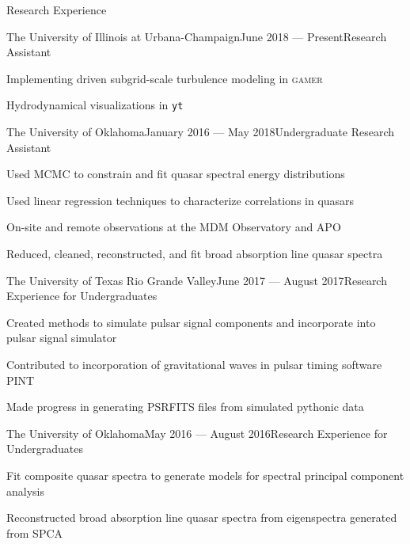 \documentclass{resume} %
\begin{document}
\begin{rSection}{Research Experience}

\begin{rSubsection}{The University of Illinois at Urbana-Champaign}{June 2018 --- Present}{Research Assistant}{}
\item Implementing driven subgrid-scale turbulence modeling in \textsc{gamer}
\item Hydrodynamical visualizations in \texttt{yt}
\end{rSubsection}


\begin{rSubsection}{The University of Oklahoma}{January 2016 --- May 2018}{Undergraduate Research Assistant}{}
\item Used MCMC to constrain and fit quasar spectral energy distributions
\item Used linear regression techniques to characterize correlations in quasars
\item On-site and remote observations at the MDM Observatory and APO
\item Reduced, cleaned, reconstructed, and fit broad absorption line quasar spectra
\end{rSubsection}


\begin{rSubsection}{The University of Texas Rio Grande Valley}{June 2017 --- August 2017}{Research Experience for Undergraduates}{}
\item Created methods to simulate pulsar signal components and incorporate into pulsar signal simulator
\item Contributed to incorporation of gravitational waves in pulsar timing software PINT
\item Made progress in generating PSRFITS files from simulated pythonic data
\end{rSubsection}


\begin{rSubsection}{The University of Oklahoma}{May 2016 --- August 2016}{Research Experience for Undergraduates}{}
\item Fit composite quasar spectra to generate models for spectral principal component analysis
\item Reconstructed broad absorption line quasar spectra from eigenspectra generated from SPCA 
\end{rSubsection}
\end{rSection}
\end{document}
